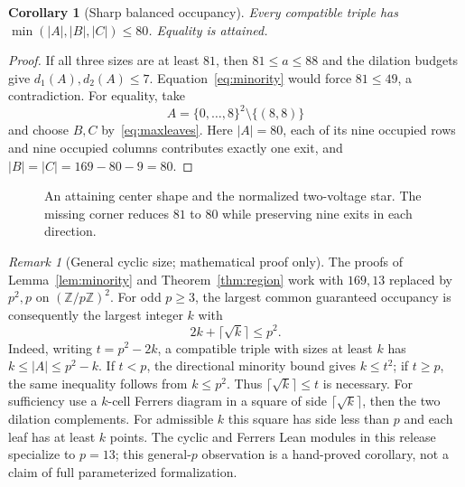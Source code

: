 \documentclass[11pt,a4paper]{article}
\newtheorem{corollary}[theorem]{Corollary}
\theoremstyle{definition}
\theoremstyle{remark}
\newtheorem{remark}[theorem]{Remark}
\newcommand{\Z}{\mathbb Z}
\begin{document}
\begin{corollary}[Sharp balanced occupancy]\label{cor:80}
Every compatible triple has
$\min(|A|,|B|,|C|)\le80$. Equality is attained.
\end{corollary}
\begin{proof}
If all three sizes are at least $81$, then $81\le a\le88$ and the
dilation budgets give $d_1(A),d_2(A)\le7$. Equation~\eqref{eq:minority}
would force $81\le49$, a contradiction. For equality, take
\[
 A=\{0,\ldots,8\}^2\setminus\{(8,8)\}
\]
and choose $B,C$ by~\eqref{eq:maxleaves}. Here $|A|=80$, each of its nine
occupied rows and nine occupied columns contributes exactly one exit,
and $|B|=|C|=169-80-9=80$.
\end{proof}

\begin{figure}[ht]
\centering
{}
\caption{An attaining center shape and the normalized two-voltage star.
The missing corner reduces $81$ to $80$ while preserving nine exits in each
direction.}
\end{figure}

\begin{remark}[General cyclic size; mathematical proof only]\label{rem:general}
The proofs of Lemma~\ref{lem:minority} and Theorem~\ref{thm:region}
work with $169,13$ replaced by $p^2,p$ on $(\Z/p\Z)^2$.
For odd $p\ge3$, the largest common guaranteed occupancy is consequently
the largest integer $k$ with
\[
 2k+\lceil\sqrt{k}\rceil\le p^2.
\]
Indeed, writing $t=p^2-2k$, a compatible triple with sizes at least $k$
has $k\le |A|\le p^2-k$. If $t<p$, the directional minority bound
gives $k\le t^2$; if $t\ge p$, the same inequality follows from
$k\le p^2$. Thus $\lceil\sqrt{k}\rceil\le t$ is necessary. For
sufficiency use a $k$-cell Ferrers diagram in a square of side
$\lceil\sqrt{k}\rceil$, then the two dilation complements. For admissible
$k$ this square has side less than $p$ and each leaf has at least $k$
points. The cyclic and Ferrers Lean modules in this release specialize
to $p=13$; this general-$p$ observation is a hand-proved corollary, not a
claim of full parameterized formalization.
\end{remark}
\end{document}
